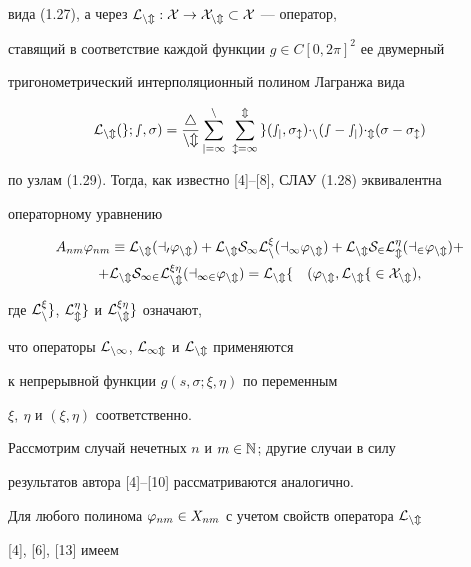 вида (1.27), а через $\cal L_{nm}:X\to X_{nm}\subset X$ --- оператор, 


ставящий в соответствие каждой функции $g\in C[0,2\pi]^2$ ее двумерный 


тригонометрический интерполяционный полином Лагранжа вида


$$


\rL_{nm}(g;s,\si) = \frac{4}{nm}\sum_{j=1}^{n}\ \sum_{l=1}^{m}


g(s_j,\si_l)\Delta_n(s-s_j)\Delta_m(\si-\si_l)


$$


по узлам (1.29). Тогда, как известно [4]--[8], СЛАУ (1.28) эквивалентна 


операторному уравнению


\begin{multline}


A_{nm}\vp_{nm}\equiv \rL_{nm}(a_0\vp_{nm})+\rL_{nm}S_1\rL_{n}^\xi(a_1\vp_{nm})+


\rL_{nm}S_2\rL_m^\eta(a_2\vp_{nm})+\\


+\rL_{nm}S_{12}\rL_{nm}^{\xi\eta}(a_{12}\vp_{nm})=\rL_{nm}f\quad


(\vp_{nm},\rL_{nm}f\in X_{nm}),


\end{multline}


где $\cal L_n^\xi g$, $\cal L_m^\eta g$ и $\cal L_{nm}^{\xi\eta} g$ означают, 


что операторы $\cal L_{n\infty}$, $\cal L_{\infty m}$ и $\cal L_{nm}$ применяются 


к непрерывной функции $g(s,\sigma;\xi,\eta)$ по переменным 


$\xi,\ \eta$ и $(\xi,\eta)$ соответственно.





Рассмотрим случай нечетных $n$ и $m \in \Bbb N$; другие случаи в силу 


результатов автора [4]--[10] рассматриваются аналогично.





Для любого полинома $\varphi_{nm}\in X_{nm}$ с учетом свойств оператора $\cal L_{nm}$


[4], [6], [13] имеем



